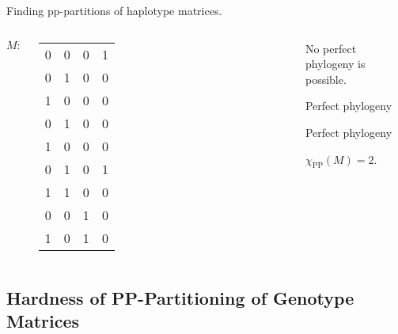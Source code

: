\documentclass{beamer}
\begin{document}
\begin{frame}{Finding pp-partitions of haplotype matrices.}
  \begin{example}
    \begin{columns}
      $M\colon$
      \footnotesize
      \begin{tabular}{cccc}
        0 & 0 & 0 & 1 \\
        0 & 1 & 0 & 0 \\
        1 & 0 & 0 & 0 \\
        0 & 1 & 0 & 0 \\
        1 & 0 & 0 & 0 \\
        0 & 1 & 0 & 1 \\
        1 & 1 & 0 & 0 \\
        0 & 0 & 1 & 0 \\
        1 & 0 & 1 & 0
      \end{tabular}%
      {%
      }
      \begin{overprint}
        No perfect phylogeny is possible.
        
        \textcolor{blue!70!bg}{Perfect phylogeny}
        
        \textcolor{red!70!bg}{Perfect phylogeny}
        
        $\chi_{\operatorname{PP}}(M) = 2$.
        
      \end{overprint}
    \end{columns}
  \end{example}
\end{frame}

\subsection{Hardness of PP-Partitioning of Genotype Matrices}
\end{document}
